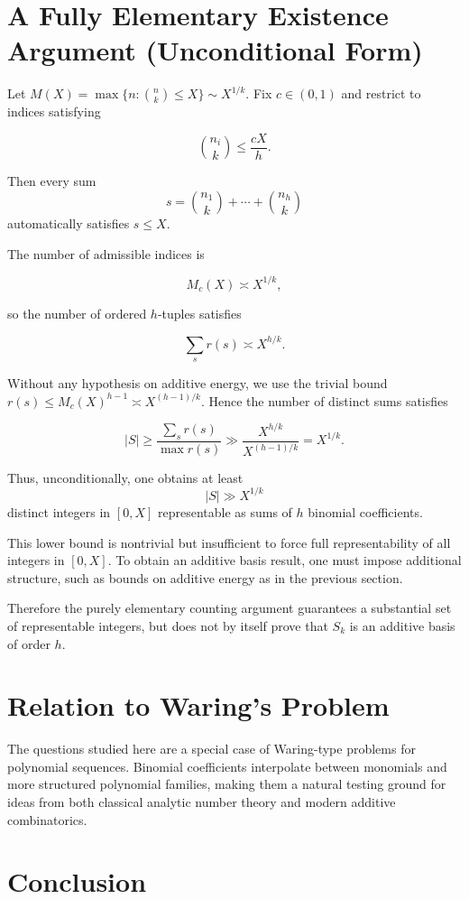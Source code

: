 \documentclass[11pt]{amsart}
\begin{document}
\section{A Fully Elementary Existence Argument (Unconditional Form)}

Let $M(X) = \max\{n : \binom{n}{k} \le X\} \sim X^{1/k}$. 
Fix $c \in (0,1)$ and restrict to indices satisfying

\[
\binom{n_i}{k} \le \frac{cX}{h}.
\]

Then every sum
\[
s = \binom{n_1}{k} + \cdots + \binom{n_h}{k}
\]
automatically satisfies $s \le X$.

The number of admissible indices is

\[
M_c(X) \asymp X^{1/k},
\]

so the number of ordered $h$-tuples satisfies

\[
\sum_s r(s) \asymp X^{h/k}.
\]

Without any hypothesis on additive energy, we use the trivial bound
$r(s) \le M_c(X)^{h-1} \asymp X^{(h-1)/k}$.
Hence the number of distinct sums satisfies

\[
|S| \ge \frac{\sum_s r(s)}{\max r(s)}
\gg \frac{X^{h/k}}{X^{(h-1)/k}}
= X^{1/k}.
\]

Thus, unconditionally, one obtains at least
\[
|S| \gg X^{1/k}
\]
distinct integers in $[0,X]$ representable as sums of $h$
binomial coefficients.

This lower bound is nontrivial but insufficient to force full
representability of all integers in $[0,X]$. To obtain an additive
basis result, one must impose additional structure, such as bounds
on additive energy as in the previous section.

Therefore the purely elementary counting argument guarantees a
substantial set of representable integers, but does not by itself
prove that $S_k$ is an additive basis of order $h$.

\section{Relation to Waring's Problem}

The questions studied here are a special case of Waring-type problems for
polynomial sequences. Binomial coefficients interpolate between monomials
and more structured polynomial families, making them a natural testing
ground for ideas from both classical analytic number theory and modern
additive combinatorics.

\section{Conclusion}
\end{document}
